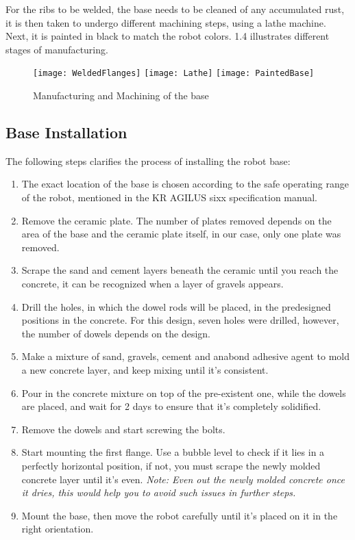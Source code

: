 For the ribs to be welded, the base needs to be cleaned of any accumulated rust, it is then taken to undergo different machining steps, using a lathe machine. Next, it is painted in black to match the robot colors.
\newline \figurename{1.4} illustrates different stages of manufacturing.

\begin{figure}[H]
	\begin{center}
		\texttt{[image: WeldedFlanges]}
		\texttt{[image: Lathe]}
		\texttt{[image: PaintedBase]}
		\caption{Manufacturing and Machining of the base}
	\end{center}
\end{figure}

\subsection{Base Installation}

The following steps clarifies the process of installing the robot base:
\begin{enumerate}
	\item The exact location of the base is chosen according to the safe operating range of the robot, mentioned in the KR AGILUS sixx specification manual.
	\item Remove the ceramic plate. The number of plates removed depends on the area of the base and the ceramic plate itself, in our case, only one plate was removed.
	\item Scrape the sand and cement layers beneath the ceramic until you reach the concrete, it can be recognized when a layer of gravels appears.
	\item Drill the holes, in which the dowel rods will be placed, in the predesigned positions in the concrete. For this design, seven holes were drilled, however, the number of dowels depends on the design.
	\item Make a mixture of sand, gravels, cement and anabond adhesive agent to mold a new concrete layer, and keep mixing until it’s consistent.
	\item Pour in the concrete mixture on top of the pre-existent one, while the dowels are placed, and wait for 2 days to ensure that it’s completely solidified.
	\item Remove the dowels and start screwing the bolts.
	\item Start mounting the first flange. Use a bubble level to check if it lies in a perfectly horizontal position, if not, you must scrape the newly molded concrete layer until it’s even. 
	\textit{\newline Note: Even out the newly molded concrete once it dries, this would help you to avoid such issues in further steps.}
	\item Mount the base, then move the robot carefully until it’s placed on it in the right orientation.
\end{enumerate}


